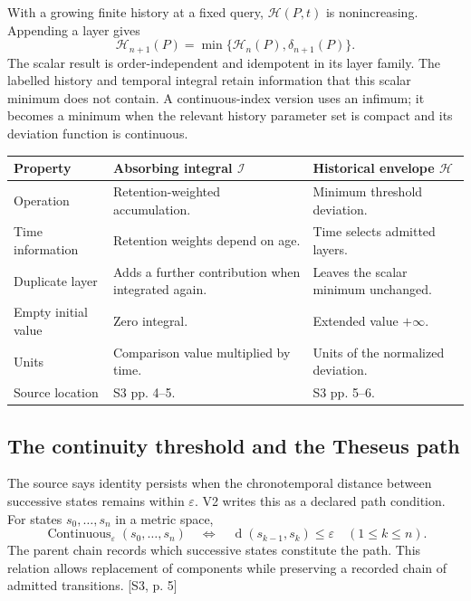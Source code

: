 \documentclass[11pt,a4paper]{article}
\numberwithin{equation}{section}
\newcommand{\src}[2]{{\sffamily\small\color{slate}[#1, #2]}}
\begin{document}
With a growing finite history at a fixed query, $\mathcal H(P,t)$ is nonincreasing. Appending a layer gives
\begin{equation}
\mathcal H_{n+1}(P)=\min\{\mathcal H_n(P),\delta_{n+1}(P)\}.
\end{equation}
The scalar result is order-independent and idempotent in its layer family. The labelled history and temporal integral retain information that this scalar minimum does not contain. A continuous-index version uses an infimum; it becomes a minimum when the relevant history parameter set is compact and its deviation function is continuous.

\begin{tabularx}{\textwidth}{@{}p{}X X@{}}
\toprule\textbf{Property} & \textbf{Absorbing integral $\mathcal I$} & \textbf{Historical envelope $\mathcal H$}\\\midrule
Operation & Retention-weighted accumulation. & Minimum threshold deviation.\\
Time information & Retention weights depend on age. & Time selects admitted layers.\\
Duplicate layer & Adds a further contribution when integrated again. & Leaves the scalar minimum unchanged.\\
Empty initial value & Zero integral. & Extended value $+\infty$.\\
Units & Comparison value multiplied by time. & Units of the normalized deviation.\\
Source location & S3 pp. 4--5. & S3 pp. 5--6.\\
\bottomrule
\end{tabularx}

\subsection{The continuity threshold and the Theseus path}
The source says identity persists when the chronotemporal distance between successive states remains within $\varepsilon$. V2 writes this as a declared path condition. For states $s_0,\ldots,s_n$ in a metric space,
\begin{equation}
\operatorname{Continuous}_\varepsilon(s_0,\ldots,s_n)
\quad\Longleftrightarrow\quad
\operatorname d(s_{k-1},s_k)\le\varepsilon\quad(1\le k\le n).
\label{eq:continuity}
\end{equation}
The parent chain records which successive states constitute the path. This relation allows replacement of components while preserving a recorded chain of admitted transitions. \src{S3}{p. 5}
\end{document}
